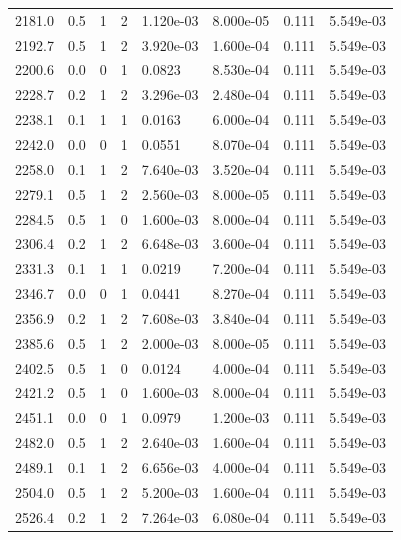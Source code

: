 \documentclass[preview]{standalone}
\begin{document}
{{{{{\begin{tabular}{L{1.2cm}C{1.2cm} C{0.3cm}C{0.5cm} C{1.4cm}C{1.4cm} C{1.4cm}C{1.4cm}}
  2181.0  &   0.5  & 1     &  2 &  1.120e-03  & 8.000e-05  & 0.111 &  5.549e-03   \\ 
  2192.7  &   0.5  & 1     &  2 &  3.920e-03  & 1.600e-04  & 0.111 &  5.549e-03   \\ 
  2200.6  &   0.0  & 0     &  1 &  0.0823  & 8.530e-04  & 0.111 &  5.549e-03   \\ 
  2228.7  &   0.2  & 1     &  2 &  3.296e-03  & 2.480e-04  & 0.111 &  5.549e-03   \\ 
  2238.1  &   0.1  & 1     &  1 &  0.0163  & 6.000e-04  & 0.111 &  5.549e-03   \\ 
  2242.0  &   0.0  & 0     &  1 &  0.0551  & 8.070e-04  & 0.111 &  5.549e-03   \\ 
  2258.0  &   0.1  & 1     &  2 &  7.640e-03  & 3.520e-04  & 0.111 &  5.549e-03   \\ 
  2279.1  &   0.5  & 1     &  2 &  2.560e-03  & 8.000e-05  & 0.111 &  5.549e-03   \\ 
  2284.5  &   0.5  & 1     &  0 &  1.600e-03  & 8.000e-04  & 0.111 &  5.549e-03   \\ 
  2306.4  &   0.2  & 1     &  2 &  6.648e-03  & 3.600e-04  & 0.111 &  5.549e-03   \\ 
  2331.3  &   0.1  & 1     &  1 &  0.0219  & 7.200e-04  & 0.111 &  5.549e-03   \\ 
  2346.7  &   0.0  & 0     &  1 &  0.0441  & 8.270e-04  & 0.111 &  5.549e-03   \\ 
  2356.9  &   0.2  & 1     &  2 &  7.608e-03  & 3.840e-04  & 0.111 &  5.549e-03   \\ 
  2385.6  &   0.5  & 1     &  2 &  2.000e-03  & 8.000e-05  & 0.111 &  5.549e-03   \\ 
  2402.5  &   0.5  & 1     &  0 &  0.0124  & 4.000e-04  & 0.111 &  5.549e-03   \\ 
  2421.2  &   0.5  & 1     &  0 &  1.600e-03  & 8.000e-04  & 0.111 &  5.549e-03   \\ 
  2451.1  &   0.0  & 0     &  1 &  0.0979  & 1.200e-03  & 0.111 &  5.549e-03   \\ 
  2482.0  &   0.5  & 1     &  2 &  2.640e-03  & 1.600e-04  & 0.111 &  5.549e-03   \\ 
  2489.1  &   0.1  & 1     &  2 &  6.656e-03  & 4.000e-04  & 0.111 &  5.549e-03   \\ 
  2504.0  &   0.5  & 1     &  2 &  5.200e-03  & 1.600e-04  & 0.111 &  5.549e-03   \\ 
  2526.4  &   0.2  & 1     &  2 &  7.264e-03  & 6.080e-04  & 0.111 &  5.549e-03   \\ 

\end{tabular}}}}}}
\end{document}
